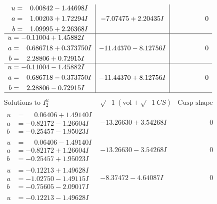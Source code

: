 \documentclass[1p]{elsarticle_modified}
\theoremstyle{definition}
\newcommand{\I}{\sqrt{-1}}
\begin{document}
$$\begin{array}{c|c|c}
\begin{aligned}
u &= \phantom{-}0.00842 - 1.44698 I \\
a &= \phantom{-}1.00203 + 1.72294 I \\
b &= \phantom{-}1.09995 + 2.26368 I\end{aligned}
 & -7.07475 + 2.20435 I & \phantom{-0.000000 } 0 \\ \hline\begin{aligned}
u &= -0.11004 + 1.45882 I \\
a &= \phantom{-}0.686718 + 0.373750 I \\
b &= \phantom{-}2.28806 + 0.72915 I\end{aligned}
 & -11.44370 - 8.12756 I & \phantom{-0.000000 } 0 \\ \hline\begin{aligned}
u &= -0.11004 - 1.45882 I \\
a &= \phantom{-}0.686718 - 0.373750 I \\
b &= \phantom{-}2.28806 - 0.72915 I\end{aligned}
 & -11.44370 + 8.12756 I & \phantom{-0.000000 } 0\\
 \hline 
 \end{array}$$\newpage$$\begin{array}{c|c|c}  
\text{Solutions to }I^u_{2}& \I (\text{vol} + \sqrt{-1}CS) & \text{Cusp shape}\\
 \hline 
\begin{aligned}
u &= \phantom{-}0.06406 + 1.49140 I \\
a &= -0.82172 - 1.26604 I \\
b &= -0.25457 - 1.95023 I\end{aligned}
 & -13.26630 + 3.54268 I & \phantom{-0.000000 } 0 \\ \hline\begin{aligned}
u &= \phantom{-}0.06406 - 1.49140 I \\
a &= -0.82172 + 1.26604 I \\
b &= -0.25457 + 1.95023 I\end{aligned}
 & -13.26630 - 3.54268 I & \phantom{-0.000000 } 0 \\ \hline\begin{aligned}
u &= -0.12213 + 1.49628 I \\
a &= -1.02750 - 1.49115 I \\
b &= -0.75605 - 2.09017 I\end{aligned}
 & -8.37472 - 4.64087 I & \phantom{-0.000000 } 0 \\ \hline\begin{aligned}
u &= -0.12213 - 1.49628 I \\

\end{aligned}
\end{array}$$
\end{document}
